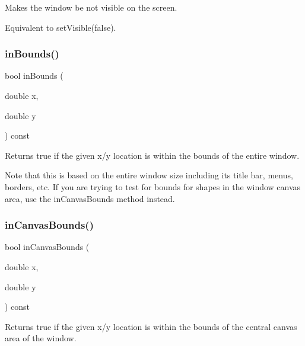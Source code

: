 Makes the window be not visible on the screen. 

Equivalent to set\+Visible(false). \mbox{\label{classGWindow_afc480f652b8c5f1fb255e2269ce68879}} 
\subsubsection{\texorpdfstring{in\+Bounds()}{inBounds()}}
{\footnotesize\ttfamily bool in\+Bounds (\begin{DoxyParamCaption}\item[{double}]{x,  }\item[{double}]{y }\end{DoxyParamCaption}) const\hspace{0.3cm}{\ttfamily [virtual]}}



Returns true if the given x/y location is within the bounds of the entire window. 

Note that this is based on the entire window size including its title bar, menus, borders, etc. If you are trying to test for bounds for shapes in the window canvas area, use the in\+Canvas\+Bounds method instead. \mbox{\label{classGWindow_ae94c9ea850cba190c985dae9fc120d32}} 
\subsubsection{\texorpdfstring{in\+Canvas\+Bounds()}{inCanvasBounds()}}
{\footnotesize\ttfamily bool in\+Canvas\+Bounds (\begin{DoxyParamCaption}\item[{double}]{x,  }\item[{double}]{y }\end{DoxyParamCaption}) const\hspace{0.3cm}{\ttfamily [virtual]}}



Returns true if the given x/y location is within the bounds of the central canvas area of the window. 

\mbox{\label{classGDrawingSurface_a814498efebc5586645159cd22990cf61}} 
